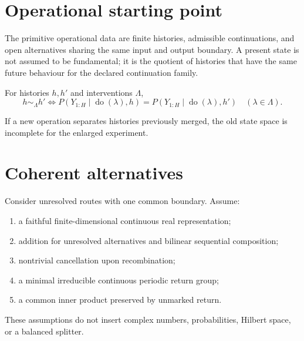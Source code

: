 \documentclass[11pt,a4paper]{article}
\begin{document}
\MakeResearchTitle
\MakeResearchContents
{}
\section{Operational starting point}
The primitive operational data are finite histories, admissible continuations, and open alternatives sharing the same input and output boundary. A present state is not assumed to be fundamental; it is the quotient of histories that have the same future behaviour for the declared continuation family.

\begin{definition}
For histories $h,h'$ and interventions $\Lambda$,
\begin{equation}
h\sim_\Lambda h'\iff
P(Y_{1:H}\mid\operatorname{do}(\lambda),h)
=P(Y_{1:H}\mid\operatorname{do}(\lambda),h')
\quad(\lambda\in\Lambda).
\end{equation}
\end{definition}
If a new operation separates histories previously merged, the old state space is incomplete for the enlarged experiment.

\section{Coherent alternatives}
Consider unresolved routes with one common boundary. Assume:
\begin{enumerate}
\item a faithful finite-dimensional continuous real representation;
\item addition for unresolved alternatives and bilinear sequential composition;
\item nontrivial cancellation upon recombination;
\item a minimal irreducible continuous periodic return group;
\item a common inner product preserved by unmarked return.
\end{enumerate}
These assumptions do not insert complex numbers, probabilities, Hilbert space, or a balanced splitter.
\end{document}
